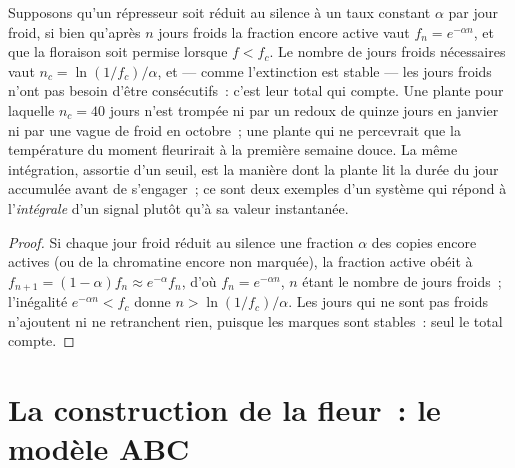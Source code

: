 \begin{theorem}\label{thm:b2:plant-flowering:integration}
Supposons qu'un répresseur soit réduit au silence à un taux constant
$\alpha$ par jour froid, si bien qu'après $n$ jours froids la fraction
encore active vaut $f_n = e^{-\alpha n}$, et que la floraison soit
permise lorsque $f < f_c$. Le nombre de jours froids nécessaires vaut
$n_c = \ln(1/f_c)/\alpha$, et --- comme l'extinction est stable --- les
jours froids n'ont pas besoin d'être consécutifs~: c'est leur total qui
compte. Une plante pour laquelle $n_c = 40$ jours n'est trompée ni par
un redoux de quinze jours en janvier ni par une vague de froid en
octobre~; une plante qui ne percevrait que la température du moment
fleurirait à la première semaine douce. La même intégration, assortie
d'un seuil, est la manière dont la plante lit la durée du jour
accumulée avant de s'engager~; ce sont deux exemples d'un système qui
répond à l'\emph{intégrale} d'un signal plutôt qu'à sa valeur
instantanée.
\end{theorem}
\begin{proof}
Si chaque jour froid réduit au silence une fraction $\alpha$ des copies
encore actives (ou de la chromatine encore non marquée), la fraction
active obéit à $f_{n+1} = (1 - \alpha)f_n \approx e^{-\alpha}f_n$,
d'où $f_n = e^{-\alpha n}$, $n$ étant le nombre de jours froids~;
l'inégalité $e^{-\alpha n} < f_c$ donne $n > \ln(1/f_c)/\alpha$. Les
jours qui ne sont pas froids n'ajoutent ni ne retranchent rien, puisque
les marques sont stables~: seul le total compte.
\end{proof}

\section{La construction de la fleur~: le modèle ABC}

